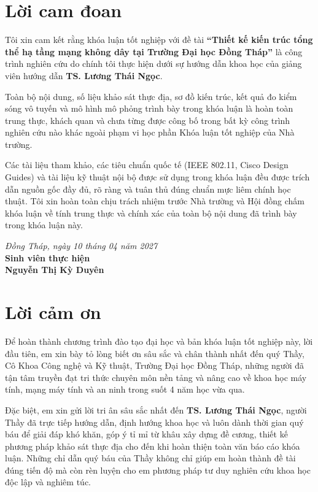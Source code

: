 \chapter*{Lời cam đoan}

Tôi xin cam kết rằng khóa luận tốt nghiệp với đề tài \textbf{“Thiết kế kiến trúc tổng thể hạ tầng mạng không dây tại Trường Đại học Đồng Tháp”} là công trình nghiên cứu do chính tôi thực hiện dưới sự hướng dẫn khoa học của giảng viên hướng dẫn \textbf{TS. Lương Thái Ngọc}.

Toàn bộ nội dung, số liệu khảo sát thực địa, sơ đồ kiến trúc, kết quả đo kiểm sóng vô tuyến và mô hình mô phỏng trình bày trong khóa luận là hoàn toàn trung thực, khách quan và chưa từng được công bố trong bất kỳ công trình nghiên cứu nào khác ngoài phạm vi học phần Khóa luận tốt nghiệp của Nhà trường.

Các tài liệu tham khảo, các tiêu chuẩn quốc tế (IEEE 802.11, Cisco Design Guides) và tài liệu kỹ thuật nội bộ được sử dụng trong khóa luận đều được trích dẫn nguồn gốc đầy đủ, rõ ràng và tuân thủ đúng chuẩn mực liêm chính học thuật. Tôi xin hoàn toàn chịu trách nhiệm trước Nhà trường và Hội đồng chấm khóa luận về tính trung thực và chính xác của toàn bộ nội dung đã trình bày trong khóa luận này.

\vspace{1.5cm}
\begin{flushright}
  \textit{Đồng Tháp, ngày 10 tháng 04 năm 2027}\\
  \textbf{Sinh viên thực hiện}\\[2.5cm]
  \textbf{Nguyễn Thị Kỳ Duyên}
\end{flushright}

\clearpage

\chapter*{Lời cảm ơn}

Để hoàn thành chương trình đào tạo đại học và bản khóa luận tốt nghiệp này, lời đầu tiên, em xin bày tỏ lòng biết ơn sâu sắc và chân thành nhất đến quý Thầy, Cô Khoa Công nghệ và Kỹ thuật, Trường Đại học Đồng Tháp, những người đã tận tâm truyền đạt tri thức chuyên môn nền tảng và nâng cao về khoa học máy tính, mạng máy tính và an ninh trong suốt 4 năm học vừa qua.

Đặc biệt, em xin gửi lời tri ân sâu sắc nhất đến \textbf{TS. Lương Thái Ngọc}, người Thầy đã trực tiếp hướng dẫn, định hướng khoa học và luôn dành thời gian quý báu để giải đáp khó khăn, góp ý tỉ mỉ từ khâu xây dựng đề cương, thiết kế phương pháp khảo sát thực địa cho đến khi hoàn thiện toàn văn báo cáo khóa luận. Những chỉ dẫn quý báu của Thầy không chỉ giúp em hoàn thành đề tài đúng tiến độ mà còn rèn luyện cho em phương pháp tư duy nghiên cứu khoa học độc lập và nghiêm túc.

